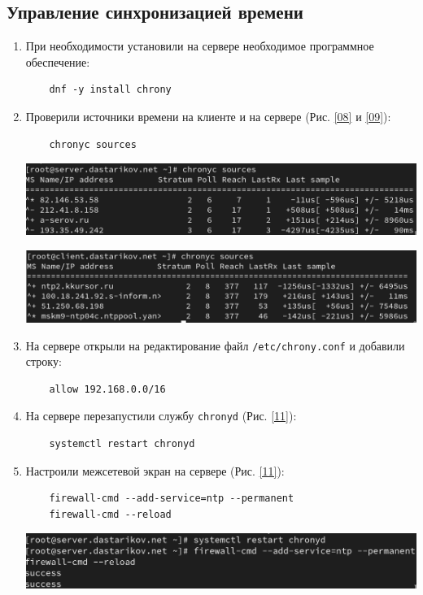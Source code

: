\subsection{Управление синхронизацией времени}
\begin{enumerate}
\item При необходимости установили на сервере необходимое программное обеспечение:
  \begin{verbatim}
    dnf -y install chrony
  \end{verbatim}
\item Проверили источники времени на клиенте и на сервере (Рис. \ref{08} и \ref{09}):
  \begin{verbatim}
    chronyc sources
  \end{verbatim}
\begin{center}
    \centering
    \includegraphics[width=\textwidth]{../images/image08.png}
    \label{08}
\end{center}
\begin{center}
    \centering
    \includegraphics[width=\textwidth]{../images/image09.png}
    \label{09}
\end{center}

\item На сервере открыли на редактирование файл \texttt{/etc/chrony.conf} и добавили строку:
  \begin{verbatim}
    allow 192.168.0.0/16
  \end{verbatim}
\item На сервере перезапустили службу \texttt{chronyd} (Рис. \ref{11}):
  \begin{verbatim}
    systemctl restart chronyd
  \end{verbatim}
\item Настроили межсетевой экран на сервере (Рис. \ref{11}):
  \begin{verbatim}
    firewall-cmd --add-service=ntp --permanent
    firewall-cmd --reload
  \end{verbatim}
\begin{center}
    \centering
    \includegraphics[width=\textwidth]{../images/image11.png}
    \label{11}
\end{center}


\end{enumerate}

